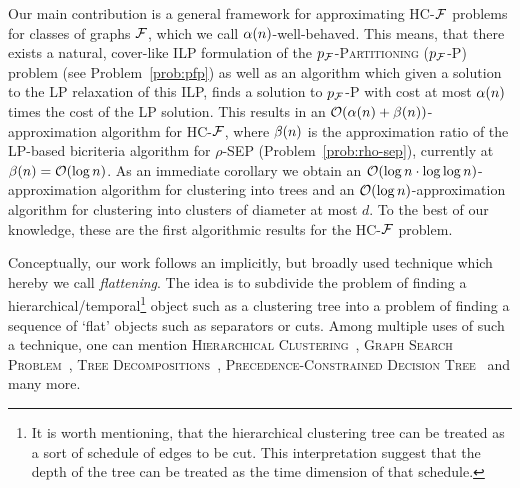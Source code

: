 Our main contribution is a general framework for approximating \textsc{HC-$\mathcal{F}$} problems for classes of graphs $\mathcal{F}$, which we call $\alpha\mathopen{}\left( n \right)$-well-behaved. This means, that there exists a natural, cover-like ILP formulation of the \textsc{$p_{\mathcal{F}}$-Partitioning} (\textsc{$p_{\mathcal{F}}$-P}) problem (see Problem~\ref{prob:pfp}) as well as an algorithm which given a solution to the LP relaxation of this ILP, finds a solution to \textsc{$p_{\mathcal{F}}$-P} with cost at most $\alpha\mathopen{}\left( n \right)$ times the cost of the LP solution. This results in an $\mathcal{O}\mathopen{}\left( \alpha\mathopen{}\left( n \right)+\beta\mathopen{}\left( n \right) \right)$-approximation algorithm for \textsc{HC-$\mathcal{F}$}, where $\beta\mathopen{}\left( n \right)$ is the approximation ratio of the LP-based bicriteria algorithm for \textsc{$\rho$-SEP} (Problem~\ref{prob:rho-sep}), currently at $\beta\mathopen{}\left( n \right)=\mathcal{O}\mathopen{}\left( \log n \right)$. As an immediate corollary we obtain an $\mathcal{O}\mathopen{}\left( \log n\cdot\log\log n \right)$-approximation algorithm for clustering into trees and an $\mathcal{O}\mathopen{}\left( \log n \right)$-approximation algorithm for clustering into clusters of diameter at most $d$. To the best of our knowledge, these are the first algorithmic results for the \textsc{HC-$\mathcal{F}$} problem.

Conceptually, our work follows an implicitly, but broadly used technique which hereby we call \textit{flattening}. The idea is to subdivide the problem of finding a hierarchical/temporal\footnote{It is worth mentioning, that the hierarchical clustering tree can be treated as a sort of schedule of edges to be cut. This interpretation suggest that the depth of the tree can be treated as the time dimension of that schedule.} object such as a clustering tree into a problem of finding a sequence of `flat' objects such as separators or cuts. Among multiple uses of such a technique, one can mention \textsc{Hierarchical Clustering}~\cite{ACostFunctionForSimilarityBasedHierarchicalClustering, ApproximateHierarchicalClusteringViaSparsestCutAndSpreadingMetrics,Hierarchical_Clustering_Objective_Functions_and_Algorithms}, \textsc{Graph Search Problem}~\cite{Approximating_the_Average_Case_Graph_Search_Problem_with_Non_uniform_Costs}, \textsc{Tree Decompositions}~\cite{Approximating_Treewidth_Pathwidth_Frontsize_and_Shortest_Elimination_Tree}, \textsc{Precedence-Constrained Decision Tree}~\cite{Precedence-Constrained_Decision_Trees_and_Coverings} and many more.

